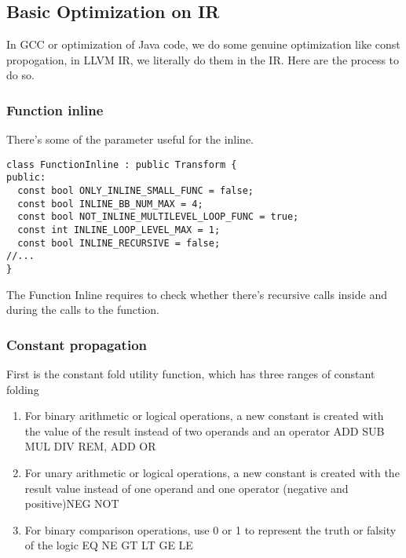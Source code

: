 \documentclass[a4paper]{exam}
\theoremstyle{definition}
\begin{document}
\subsection{Basic Optimization on IR}
In GCC or optimization of Java code, we do some genuine optimization like const propogation, in LLVM IR, we literally do them in the IR. Here are the process to do so.

\subsubsection{Function inline}
There's some of the parameter useful for the inline.
\begin{verbatim}
class FunctionInline : public Transform {
public:
  const bool ONLY_INLINE_SMALL_FUNC = false;
  const bool INLINE_BB_NUM_MAX = 4;
  const bool NOT_INLINE_MULTILEVEL_LOOP_FUNC = true;
  const int INLINE_LOOP_LEVEL_MAX = 1;
  const bool INLINE_RECURSIVE = false;
//...
}
\end{verbatim}
The Function Inline requires to check whether there's recursive calls inside and during the calls to the function.
\subsubsection{Constant propagation}

First is the constant fold utility function, which has three ranges of constant folding
\begin{enumerate}
    \item For binary arithmetic or logical operations, a new constant is created with the value of the result instead of two operands and an operator ADD SUB MUL DIV REM, ADD OR
\item For unary arithmetic or logical operations, a new constant is created with the result value instead of one operand and one operator (negative and positive)NEG NOT
\item For binary comparison operations, use 0 or 1 to represent the truth or falsity of the logic EQ NE GT LT GE LE
\end{enumerate}
\end{document}
